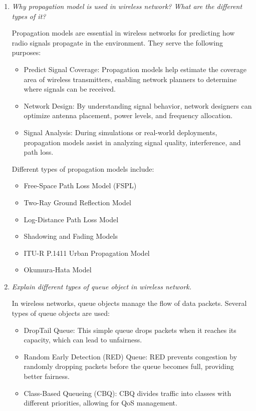 \documentclass[11pt]{article}
\begin{document}
\begin{enumerate}
    \item \textit{Why propagation model is used in wireless network? What are the different types of it?}

          Propagation models are essential in wireless networks for predicting how radio signals propagate in the environment. They serve the following purposes:

          \begin{itemize}
              \item Predict Signal Coverage: Propagation models help estimate the coverage area of wireless transmitters, enabling network planners to determine where signals can be received.
              \item Network Design: By understanding signal behavior, network designers can optimize antenna placement, power levels, and frequency allocation.
              \item Signal Analysis: During simulations or real-world deployments, propagation models assist in analyzing signal quality, interference, and path loss.
          \end{itemize}

          Different types of propagation models include:

          \begin{itemize}
              \item Free-Space Path Loss Model (FSPL)
              \item Two-Ray Ground Reflection Model
              \item Log-Distance Path Loss Model
              \item Shadowing and Fading Models
              \item ITU-R P.1411 Urban Propagation Model
              \item Okumura-Hata Model
          \end{itemize}

    \item \textit{Explain different types of queue object in wireless network.}

          In wireless networks, queue objects manage the flow of data packets. Several types of queue objects are used:

          \begin{itemize}
              \item DropTail Queue: This simple queue drops packets when it reaches its capacity, which can lead to unfairness.
              \item Random Early Detection (RED) Queue: RED prevents congestion by randomly dropping packets before the queue becomes full, providing better fairness.
              \item Class-Based Queueing (CBQ): CBQ divides traffic into classes with different priorities, allowing for QoS management.
          \end{itemize}


\end{enumerate}
\end{document}
